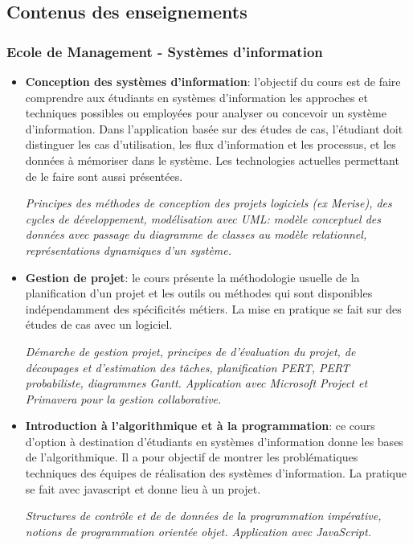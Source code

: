 \documentclass[11pt]{article}
\begin{document}
\subsection{Contenus des enseignements}

\subsubsection*{Ecole de Management - Systèmes d'information}
\begin{itemize}
%
\item \textbf{Conception des systèmes d'information}: l'objectif du cours est de faire comprendre
aux étudiants en systèmes d'information les approches et techniques possibles ou employées 
pour analyser ou concevoir un système d'information. Dans l'application basée sur des études de cas, 
l'étudiant doit distinguer les cas d'utilisation, les flux d'information et les processus, et 
les données à mémoriser dans le système. Les technologies actuelles permettant de le faire sont 
aussi présentées.

\textit{Principes des méthodes de conception des projets logiciels 
(ex Merise), des cycles de développement, modélisation avec UML: modèle conceptuel des données
avec passage du diagramme de classes au modèle relationnel, représentations dynamiques d'un système. }\\

%
\item \textbf{Gestion de projet}: le cours présente la méthodologie usuelle de la planification
d'un projet et les outils ou méthodes qui sont disponibles indépendamment des spécificités
métiers. La mise en pratique se fait sur des études de cas avec un logiciel.

\textit{Démarche de gestion projet, principes de d'évaluation du projet, de découpages et 
d'estimation des tâches, planification PERT, PERT probabiliste, diagrammes Gantt. 
Application avec Microsoft Project et Primavera pour la gestion collaborative.}\\ 

%
\item \textbf{Introduction à l'algorithmique et à la programmation}: ce cours d'option
à destination d'étudiants en systèmes d'information donne les bases de l'algorithmique.
Il a pour objectif de montrer les problématiques techniques des équipes de réalisation
des systèmes d'information. La pratique se fait avec javascript et donne lieu à un projet.

\textit{Structures de contrôle et de
de données de la programmation impérative, notions de programmation orientée objet. 
Application avec JavaScript.}\\


\end{itemize}
\end{document}
